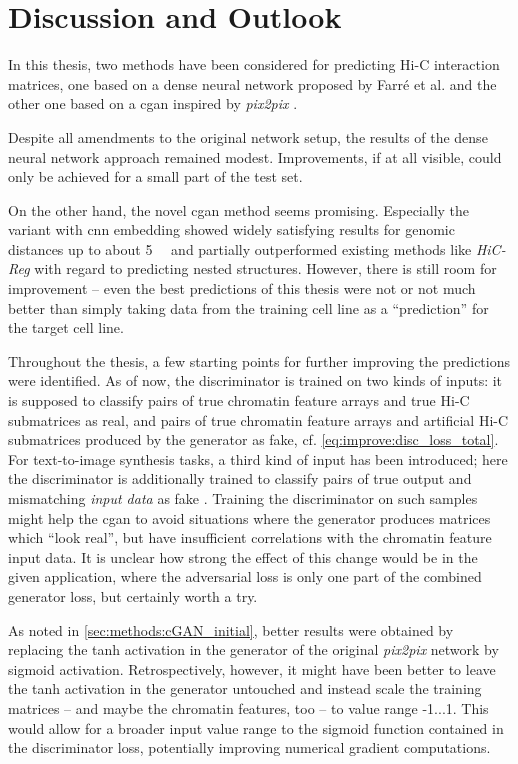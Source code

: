 \section{Discussion and Outlook}
In this thesis, two methods have been considered for predicting Hi-C interaction matrices,
one based on a dense neural network proposed by Farr\'e et al. \cite{Farre2018a} and the other one based on a \acrlong{cgan}
inspired by \emph{pix2pix} \cite{Isola2017}.

Despite all amendments to the original network setup,
the results of the dense neural network approach remained modest.
Improvements, if at all visible, could only be achieved for a small part of the test set.

On the other hand, the novel \acrfull{cgan} method seems promising.
Especially the variant with \acrshort{cnn} embedding showed widely satisfying results for genomic distances up to about \SI{5}{\mega\bp}
and partially outperformed existing methods like \emph{HiC-Reg} \cite{Zhang2019} with regard to predicting nested structures.
However, there is still room for improvement -- even the best predictions of this thesis were not or not much better 
than simply taking data from the training cell line as a ``prediction'' for the target cell line.

Throughout the thesis, a few starting points for further improving the predictions were identified.
As of now, the discriminator is trained on two kinds of inputs:
it is supposed to classify pairs of true chromatin feature arrays and true Hi-C submatrices as real, 
and pairs of true chromatin feature arrays and artificial Hi-C submatrices produced by the generator as fake, cf. \cref{eq:improve:disc_loss_total}.
For text-to-image synthesis tasks, a third kind of input has been introduced; here the discriminator is additionally trained 
to classify pairs of true output and mismatching \emph{input data} as fake \cite{Reed2016}.
Training the discriminator on such samples might help the \acrshort{cgan} to avoid situations 
where the generator produces matrices which ``look real'', 
but have insufficient correlations with the chromatin feature input data.
It is unclear how strong the effect of this change would be in the given application, 
where the adversarial loss is only one part of the combined generator loss, but certainly worth a try.

As noted in \cref{sec:methods:cGAN_initial}, better results were obtained by replacing the tanh activation in the generator 
of the original \emph{pix2pix} network by sigmoid activation.
Retrospectively, however, it might have been better to leave the tanh activation in the generator untouched
and instead scale the training matrices -- and maybe the chromatin features, too -- to value range -1...1.
This would allow for a broader input value range to the sigmoid function contained in the discriminator loss,
potentially improving numerical gradient computations.

